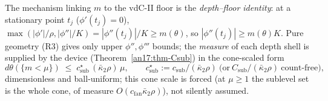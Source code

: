 The mechanism linking $m$ to the vdC-II floor is the \emph{depth--floor identity}:
at a stationary point $t_j$ ($\phi'(t_j)=0$), $\max(|\phi'|/\rho,|\phi''|/K)=
|\phi''(t_j)|/K\ge m(\theta)$, so $|\phi''(t_j)|\ge m(\theta)K$. Pure geometry
(R3) gives only upper $\phi'',\phi'''$ bounds; the \emph{measure} of each depth
shell is supplied by the device (Theorem~\ref{an17:thm-Csub}) in the cone-scaled
form
\begin{equation}\label{eq:an17-conescale}
 d\theta(\{m<\mu\})\;\le\;c_{\mathrm{sub}}^\star\,(\bar\kappa_2\rho)\,\mu,
 \qquad c_{\mathrm{sub}}^\star:=c_{\mathrm{sub}}/(\bar\kappa_2\rho)\ \text{(or}\
 C_{\mathrm{sub}}/(\bar\kappa_2\rho)\ \text{count-free)},
\end{equation}
dimensionless and ball-uniform; this cone scale is forced (at $\mu\ge1$ the
sublevel set is the whole cone, of measure $O(c_{\mathrm{fan}}\bar\kappa_2\rho)$),
not silently assumed.


